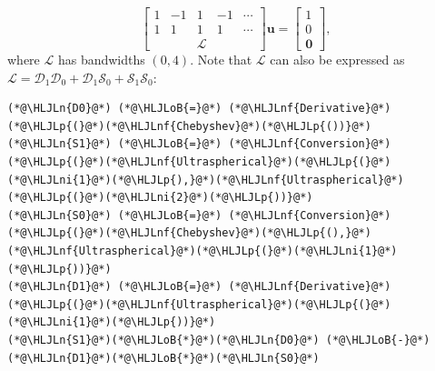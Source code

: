 \documentclass[12pt,a4paper]{article}
\newcommand{\HLJLn}[1]{#1}
\newcommand{\HLJLnf}[1]{\textcolor[RGB]{66,102,213}{#1}}
\newcommand{\HLJLni}[1]{\textcolor[RGB]{59,151,46}{#1}}
\newcommand{\HLJLoB}[1]{\textcolor[RGB]{102,102,102}{\textbf{#1}}}
\newcommand{\HLJLp}[1]{#1}
\begin{document}
\[
\begin{bmatrix}
1 & -1 &  1 & -1 & \cdots  \\
1 & 1  &  1 & 1  & \cdots \\
& &\mathcal{L} & &
\end{bmatrix}\mathbf{u} = \begin{bmatrix} 1  \\
0 \\
\mathbf{0}
\end{bmatrix},
\]
where $\mathcal{L}$ has bandwidths $(0,4)$. Note that $\mathcal{L}$ can also be expressed as $\mathcal{L} = \mathcal{D}_1\mathcal{D}_0  + \mathcal{D}_1\mathcal{S}_0 + \mathcal{S}_1\mathcal{S}_0$:


\begin{lstlisting}
(*@\HLJLn{D0}@*) (*@\HLJLoB{=}@*) (*@\HLJLnf{Derivative}@*)(*@\HLJLp{(}@*)(*@\HLJLnf{Chebyshev}@*)(*@\HLJLp{())}@*)
(*@\HLJLn{S1}@*) (*@\HLJLoB{=}@*) (*@\HLJLnf{Conversion}@*)(*@\HLJLp{(}@*)(*@\HLJLnf{Ultraspherical}@*)(*@\HLJLp{(}@*)(*@\HLJLni{1}@*)(*@\HLJLp{),}@*)(*@\HLJLnf{Ultraspherical}@*)(*@\HLJLp{(}@*)(*@\HLJLni{2}@*)(*@\HLJLp{))}@*)
(*@\HLJLn{S0}@*) (*@\HLJLoB{=}@*) (*@\HLJLnf{Conversion}@*)(*@\HLJLp{(}@*)(*@\HLJLnf{Chebyshev}@*)(*@\HLJLp{(),}@*)(*@\HLJLnf{Ultraspherical}@*)(*@\HLJLp{(}@*)(*@\HLJLni{1}@*)(*@\HLJLp{))}@*)
(*@\HLJLn{D1}@*) (*@\HLJLoB{=}@*) (*@\HLJLnf{Derivative}@*)(*@\HLJLp{(}@*)(*@\HLJLnf{Ultraspherical}@*)(*@\HLJLp{(}@*)(*@\HLJLni{1}@*)(*@\HLJLp{))}@*)
(*@\HLJLn{S1}@*)(*@\HLJLoB{*}@*)(*@\HLJLn{D0}@*) (*@\HLJLoB{-}@*) (*@\HLJLn{D1}@*)(*@\HLJLoB{*}@*)(*@\HLJLn{S0}@*)
\end{lstlisting}
\end{document}
